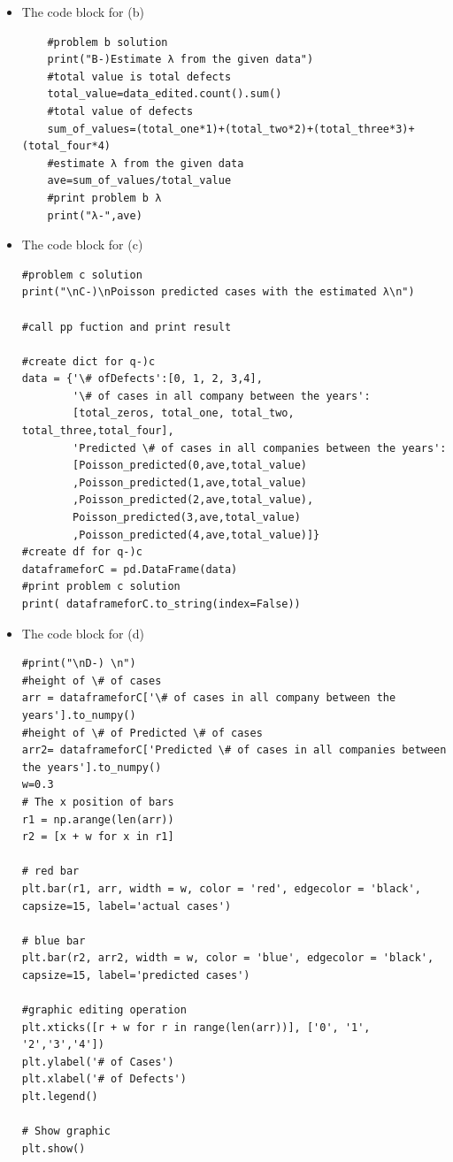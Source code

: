 \documentclass[a4 paper]{article}
\numberwithin{equation}{section}
\newcommand{\0}{\mathbf{0}}
\begin{document}
	\begin{itemize}
		\item The code block for (b)\\
		\begin{lstlisting}
	#problem b solution
	print("B-)Estimate λ from the given data")
	#total value is total defects
	total_value=data_edited.count().sum()
	#total value of defects
	sum_of_values=(total_one*1)+(total_two*2)+(total_three*3)+(total_four*4)
	#estimate λ from the given data
	ave=sum_of_values/total_value
	#print problem b λ
	print("λ-",ave)
 \end{lstlisting}
\end{itemize}
    \begin{itemize}
		\item The code block for (c)\\
		\begin{lstlisting}
#problem c solution
print("\nC-)\nPoisson predicted cases with the estimated λ\n")

#call pp fuction and print result

#create dict for q-)c
data = {'\# ofDefects':[0, 1, 2, 3,4], 
        '\# of cases in all company between the years':
        [total_zeros, total_one, total_two, total_three,total_four],
        'Predicted \# of cases in all companies between the years':
        [Poisson_predicted(0,ave,total_value)
        ,Poisson_predicted(1,ave,total_value)
        ,Poisson_predicted(2,ave,total_value),
        Poisson_predicted(3,ave,total_value)
        ,Poisson_predicted(4,ave,total_value)]}
#create df for q-)c  
dataframeforC = pd.DataFrame(data) 
#print problem c solution
print( dataframeforC.to_string(index=False))
\end{lstlisting}
 \end{itemize}   
    \begin{itemize}
		\item The code block for (d)\\
		\begin{lstlisting}
#print("\nD-) \n")
#height of \# of cases
arr = dataframeforC['\# of cases in all company between the years'].to_numpy()
#height of \# of Predicted \# of cases
arr2= dataframeforC['Predicted \# of cases in all companies between the years'].to_numpy()
w=0.3 
# The x position of bars
r1 = np.arange(len(arr))
r2 = [x + w for x in r1]

# red bar
plt.bar(r1, arr, width = w, color = 'red', edgecolor = 'black', capsize=15, label='actual cases')
 
# blue bar
plt.bar(r2, arr2, width = w, color = 'blue', edgecolor = 'black', capsize=15, label='predicted cases')
 
#graphic editing operation
plt.xticks([r + w for r in range(len(arr))], ['0', '1', '2','3','4'])
plt.ylabel('# of Cases')
plt.xlabel('# of Defects')
plt.legend()
 
# Show graphic
plt.show()
        \end{lstlisting}
	\end{itemize}
	
	
	
	
\end{document}
